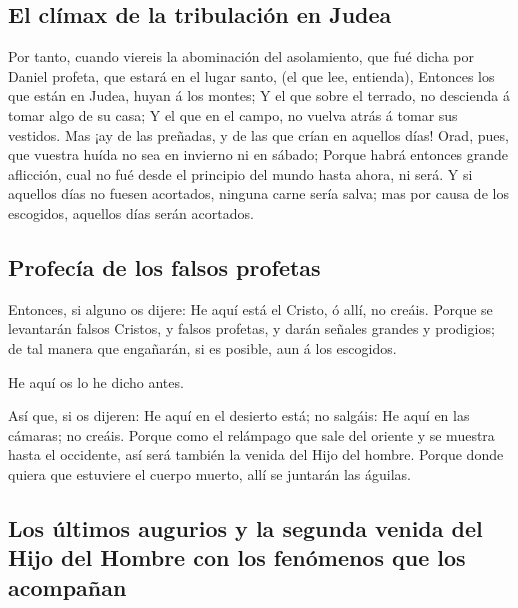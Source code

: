 \hypertarget{el-cluxedmax-de-la-tribulaciuxf3n-en-judea}{%
\subsection{El clímax de la tribulación en
Judea}\label{el-cluxedmax-de-la-tribulaciuxf3n-en-judea}}

 Por tanto, cuando viereis la abominación del
asolamiento, que fué dicha por Daniel profeta, que estará en el lugar
santo, (el que lee, entienda),  Entonces los que están en
Judea, huyan á los montes;  Y el que sobre el terrado, no
descienda á tomar algo de su casa;  Y el que en el campo,
no vuelva atrás á tomar sus vestidos.  Mas ¡ay de las
preñadas, y de las que crían en aquellos días!  Orad,
pues, que vuestra huída no sea en invierno ni en sábado; 
Porque habrá entonces grande aflicción, cual no fué desde el principio
del mundo hasta ahora, ni será.  Y si aquellos días no
fuesen acortados, ninguna carne sería salva; mas por causa de los
escogidos, aquellos días serán acortados.

\hypertarget{profecuxeda-de-los-falsos-profetas}{%
\subsection{Profecía de los falsos
profetas}\label{profecuxeda-de-los-falsos-profetas}}

 Entonces, si alguno os dijere: He aquí está el Cristo, ó
allí, no creáis.  Porque se levantarán falsos Cristos, y
falsos profetas, y darán señales grandes y prodigios; de tal manera que
engañarán, si es posible, aun á los escogidos.

 He aquí os lo he dicho antes.

 Así que, si os dijeren: He aquí en el desierto está; no
salgáis: He aquí en las cámaras; no creáis.  Porque como
el relámpago que sale del oriente y se muestra hasta el occidente, así
será también la venida del Hijo del hombre.  Porque donde
quiera que estuviere el cuerpo muerto, allí se juntarán las águilas.

\hypertarget{los-uxfaltimos-augurios-y-la-segunda-venida-del-hijo-del-hombre-con-los-fenuxf3menos-que-los-acompauxf1an}{%
\subsection{Los últimos augurios y la segunda venida del Hijo del Hombre
con los fenómenos que los
acompañan}\label{los-uxfaltimos-augurios-y-la-segunda-venida-del-hijo-del-hombre-con-los-fenuxf3menos-que-los-acompauxf1an}}

